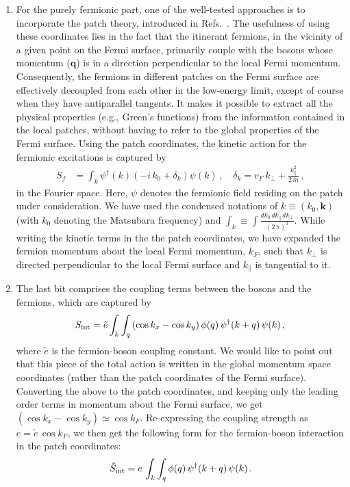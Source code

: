 \documentclass[aps, prb, onecolumn, nofootinbib, citeautoscript, 10pt]{revtex4-2}
\begin{document}
\begin{enumerate}[leftmargin=*]
\item For the purely fermionic part, one of the well-tested approaches is to incorporate the patch theory, introduced in Refs.~\cite{metlsach1,sachdev_2011,Lee-Dalid,ips-uv-ir1,ips-uv-ir2,ips-nfl-u1}. The usefulness of using these coordinates lies in the fact that the itinerant fermions, in the vicinity of a given point on the Fermi surface, primarily couple with the bosons whose momentum ($\mathbf q$) is in a direction perpendicular to the local Fermi momentum. Consequently, the fermions in different patches on the Fermi surface are effectively decoupled from each other in the low-energy limit, except of course when they have antiparallel tangents. It makes it possible to extract all the physical properties (e.g., Green’s functions) from the information contained in the local patches, without having to refer to the global properties of the Fermi surface. Using the patch coordinates, the kinetic action for the fermionic excitations is captured by
\begin{align}
	\label{ac2}
	S_f  & =   
	\int_{k} \psi^\dagger (k) 
	\left ( -i \,k_0  +  \delta_k \right ) \psi (k) \,,
	\quad \delta_k =  v_F \,k_{\perp}  +   \frac{k_{\parallel}^2} {2\,m}\,,
\end{align}
in the Fourier space. Here, $\psi$ denotes the fermionic field residing on the patch under consideration. We have used the condensed notations of $k \equiv (k_0, \mathbf k)$ (with $k_0 $ denoting the Matsubara frequency) and $ \int_k  \equiv \int \frac{dk_0\,dk_{\parallel}\,dk_\perp } {(2\,\pi)^3}$.
While writing the kinetic terms in the the patch coordinates, we have expanded the fermion momentum about the local Fermi momentum, $k_F$, such that $ k_{\perp}$ is directed perpendicular to the local Fermi surface and $k_{\parallel}$ is tangential to it.

\item The last bit comprises the coupling terms between the bosons and the fermions, which are captured by
\begin{align}
	\label{ac3}
	S_{\rm int} = \tilde e
	\int_{k} \int_q \left(  \cos k_x -\cos k_y  \right)
	\phi(q) \,\psi^\dagger (k + q) \, \psi(k) \,,
\end{align}
where $\tilde e$ is the fermion-boson coupling constant. We would like to point out that this piece of the total action is written in the global momentum space coordinates (rather than the patch coordinates of the Fermi surface).
Converting the above to the patch coordinates, and keeping only the leading order terms in momentum about the Fermi surface, we get
$\left(  \cos k_x -\cos k_y  \right) \simeq \cos k_F$. Re-expressing the coupling strength as $e = \tilde e \, \cos k_F$, we then get the following form for the fermion-boson interaction in the patch coordinates:
\begin{align}
\tilde S_{\rm int} 
= e\,  \int_{k}  \int_q \phi(q) \,\psi^\dagger (k + q) \, \psi(k) \,.
\end{align}

\end{enumerate} 
\end{document}
